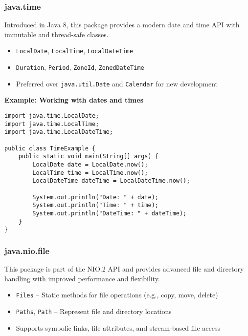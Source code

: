\documentclass{article}
\newcommand{\codecmd}[1]{\textcolor[rgb]{0,0.5,0}{\texttt{#1}}}
\begin{document}
\subsubsection*{java.time}

Introduced in Java 8, this package provides a modern date and time API with immutable and thread-safe classes.

\begin{itemize}
    \item \codecmd{LocalDate}, \codecmd{LocalTime}, \codecmd{LocalDateTime}
    \item \codecmd{Duration}, \codecmd{Period}, \codecmd{ZoneId}, \codecmd{ZonedDateTime}
    \item Preferred over \codecmd{java.util.Date} and \codecmd{Calendar} for new development
\end{itemize}

\noindent\textbf{Example: Working with dates and times}
\begin{verbatim}
import java.time.LocalDate;
import java.time.LocalTime;
import java.time.LocalDateTime;

public class TimeExample {
    public static void main(String[] args) {
        LocalDate date = LocalDate.now();
        LocalTime time = LocalTime.now();
        LocalDateTime dateTime = LocalDateTime.now();

        System.out.println("Date: " + date);
        System.out.println("Time: " + time);
        System.out.println("DateTime: " + dateTime);
    }
}
\end{verbatim}

\subsubsection*{java.nio.file}

This package is part of the NIO.2 API and provides advanced file and directory handling with improved performance and flexibility.

\begin{itemize}
    \item \codecmd{Files} – Static methods for file operations (e.g., copy, move, delete)
    \item \codecmd{Paths}, \codecmd{Path} – Represent file and directory locations
    \item Supports symbolic links, file attributes, and stream-based file access
\end{itemize}
\end{document}
